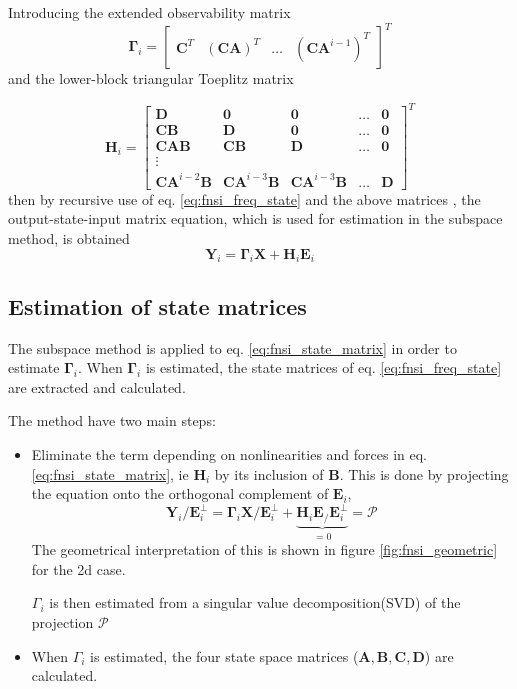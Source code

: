 Introducing the extended observability matrix
\begin{equation}
  \bm \Gamma_i =
  \begin{bmatrix}
    \bm C^T & (\bm C \bm A)^T & \dots & (\bm C \bm A^{i-1})^T
  \end{bmatrix}^T
\end{equation}
and the lower-block triangular Toeplitz matrix

\begin{equation}
  \bm H_i =
  \begin{bmatrix}
    \bm D                   & \bm 0                   & \bm 0                   & \dots & \bm 0 \\
    \bm C \bm B             & \bm D                   & \bm 0                   & \dots & \bm 0 \\
    \bm C \bm A \bm B       & \bm C \bm B             & \bm D                   & \dots & \bm 0 \\
    \vdots \\
    \bm C \bm A^{i-2} \bm B & \bm C \bm A^{i-3} \bm B & \bm C \bm A^{i-3} \bm B & \dots & \bm D
  \end{bmatrix}^T
\end{equation}
then by recursive use of eq. \eqref{eq:fnsi_freq_state} and the above matrices
\autocite{noel2013a}, the output-state-input matrix equation, which is used for
estimation in the subspace method, is obtained
\begin{equation}
  \label{eq:fnsi_state_matrix}
  \bm Y_i = \bm \Gamma_i \bm X + \bm H_i \bm E_i
\end{equation}


\subsection{Estimation of state matrices}

The subspace method is applied to eq. \eqref{eq:fnsi_state_matrix} in order to
estimate $\bm \Gamma_i$. When $\bm \Gamma_i$ is estimated, the state matrices of
eq. \eqref{eq:fnsi_freq_state} are extracted and calculated.

The method have two main steps:
\begin{itemize}
\item Eliminate the term depending on nonlinearities and forces in eq.
  \eqref{eq:fnsi_state_matrix}, ie $\bm H_i$ by its inclusion of $\bm B$. This
  is done by projecting the equation onto the orthogonal complement of $\bm
  E_i$,
  \begin{equation}
    \bm Y_i / \bm E_i^\perp = \bm \Gamma_i \bm X / \bm E_i^\perp +
    \underbrace{\bm H_i \bm E_ / \bm E_i^\perp}_{=0}
    = \mathcal{P}
  \end{equation}
  The geometrical interpretation of this is shown in figure
  \ref{fig:fnsi_geometric} for the 2d case.

  $\Gamma_i$ is then estimated from a singular value decomposition(SVD) of the
  projection $\mathcal{P}$
\item When $\Gamma_i$ is estimated, the four state space matrices ($\bm A, \bm
  B, \bm C, \bm D$) are calculated.
\end{itemize}

